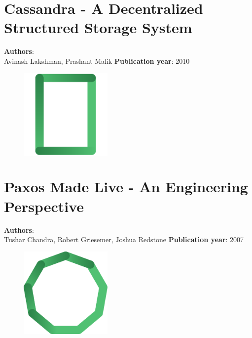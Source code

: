 \documentclass[11pt,fleqn]{book} %
\begin{document}
\chapter{Cassandra - A Decentralized Structured Storage System}
\vspace*{-7mm}
\Large \textbf{Authors}: \\
Avinash Lakshman, Prashant Malik
\newline\newline
\textbf{Publication year}: 2010
\begin{figure}[b]
    \centering
    \includegraphics[width=0.4\textwidth]{distributed-systems-rectangle.pdf}
\end{figure}


\chapter{Paxos Made Live - An Engineering Perspective}
\vspace*{-7mm}
\Large \textbf{Authors}: \\
Tushar Chandra, Robert Griesemer, Joshua Redstone
\newline\newline
\textbf{Publication year}: 2007
\begin{figure}[b]
    \centering
    \includegraphics[width=0.4\textwidth]{distributed-systems.pdf}
\end{figure}

\end{document}
